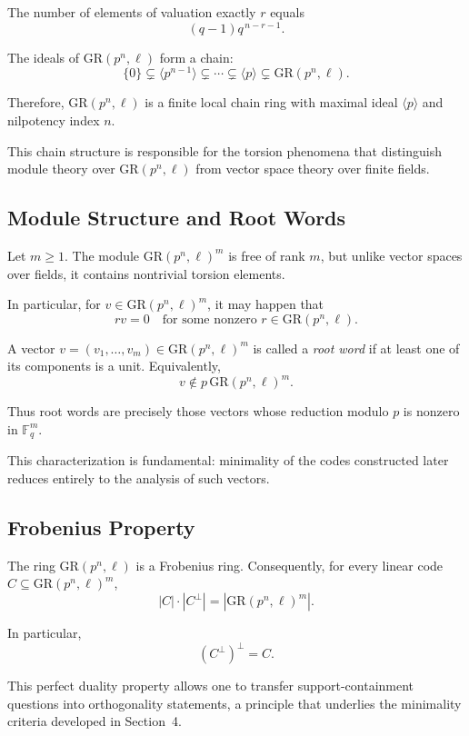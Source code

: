 \documentclass[10pt]{article}
\theoremstyle{definition}
\begin{document}
The number of elements of valuation exactly $r$ equals
\[
(q-1)q^{\,n-r-1}.
\]

The ideals of $\mathrm{GR}(p^{n},\ell)$ form a chain:
\[
\{0\}
\subsetneq
\langle p^{n-1}\rangle
\subsetneq
\cdots
\subsetneq
\langle p\rangle
\subsetneq
\mathrm{GR}(p^{n},\ell).
\]

Therefore, $\mathrm{GR}(p^{n},\ell)$
is a finite local chain ring with maximal ideal $\langle p\rangle$
and nilpotency index $n$.

This chain structure is responsible for the torsion phenomena
that distinguish module theory over $\mathrm{GR}(p^{n},\ell)$
from vector space theory over finite fields.

\subsection{Module Structure and Root Words}

Let $m\ge 1$.
The module $\mathrm{GR}(p^{n},\ell)^{m}$
is free of rank $m$,
but unlike vector spaces over fields,
it contains nontrivial torsion elements.

In particular, for $v \in \mathrm{GR}(p^{n},\ell)^m$,
it may happen that
\[
r v = 0
\quad \text{for some nonzero } r \in \mathrm{GR}(p^{n},\ell).
\]

A vector
$v=(v_1,\dots,v_m)\in \mathrm{GR}(p^{n},\ell)^m$
is called a \emph{root word}
if at least one of its components is a unit.
Equivalently,
\[
v \notin p\,\mathrm{GR}(p^{n},\ell)^m.
\]

Thus root words are precisely those vectors
whose reduction modulo $p$ is nonzero in $\mathbb{F}_q^m$.

This characterization is fundamental:
minimality of the codes constructed later
reduces entirely to the analysis of such vectors.

\subsection{Frobenius Property}

The ring $\mathrm{GR}(p^{n},\ell)$
is a Frobenius ring.
Consequently, for every linear code
$C\subseteq \mathrm{GR}(p^{n},\ell)^{m}$,
\[
|C|\cdot |C^{\perp}|
=
|\mathrm{GR}(p^{n},\ell)^{m}|.
\]

In particular,
\[
(C^{\perp})^{\perp}=C.
\]

This perfect duality property allows one to transfer
support-containment questions into orthogonality statements,
a principle that underlies the minimality criteria
developed in Section~4.
\end{document}

